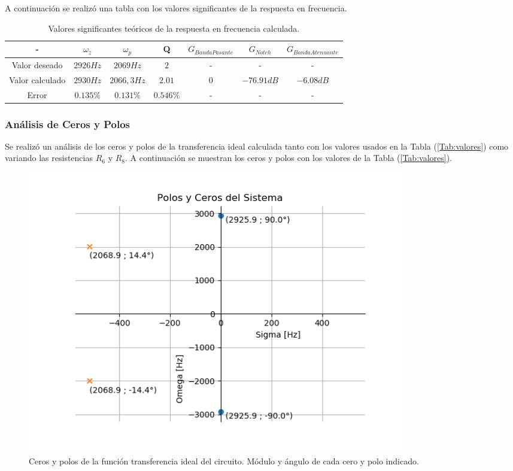 \documentclass[a4paper]{article}
\begin{document}
A continuación se realizó una tabla con los valores significantes de la respuesta en frecuencia.

\begin{table}[H]
\centering
\begin{tabular}{@{}ccccccc@{}}
\toprule
- & $\omega_z$ & $\omega_p$ & Q & $G_{Banda Pasante}$  & $G_{Notch}$ & $G_{Banda Atenuante}$ \\ \midrule
Valor deseado & $2926Hz$ & $2069Hz$ & $2$ & - & - & - \\
Valor calculado & $2930Hz$ & $2066,3Hz$ & $2.01$ & $0$ & $-76.91dB$ & $-6.08dB$ \\ 
Error & $0.135\%$ & $0.131\%$ & $0.546\%$ & - & - & - \\ \bottomrule
\end{tabular}
\caption{Valores significantes teóricos de la respuesta en frecuencia calculada.}
\label{tab:rta_freq_calc}
\end{table}

\subsubsection{Análisis de Ceros y Polos}

Se realizó un análisis de los ceros y polos de la transferencia ideal calculada tanto con los valores usados en la Tabla (\ref{Tab:valores}) como variando las resistencias $R_6$ y $R_8$.
A continuación se muestran los ceros y polos con los valores de la Tabla (\ref{Tab:valores}).

\begin{figure} [H]
	\centering
	\includegraphics[width=0.8\textwidth]{Imagenes/cerosypolos_calc.PNG}
	\caption{Ceros y polos de la función transferencia ideal del circuito. Módulo y ángulo de cada cero y polo indicado.}
	\label{fig:cerosypolos_calc}
\end{figure}
\end{document}
